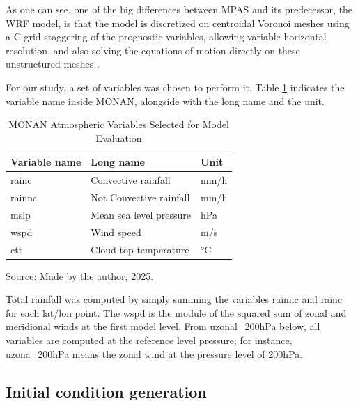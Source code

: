 As one can see, one of the big differences between MPAS and its predecessor, the WRF model, is that the model is discretized on centroidal Voronoi meshes using a C-grid staggering of the prognostic variables, allowing variable horizontal resolution, and also solving the equations of motion directly on these unstructured meshes \cite{skamarock2012multiscale}. 

For our study, a set of variables was chosen to perform it. Table \ref{tab:monan atmospheric variables} indicates the variable name inside MONAN, alongside with the long name and the unit.

\begin{table}[htbp]
	\centering
	\caption{MONAN Atmospheric Variables Selected for Model Evaluation}
	\vspace{2mm}
	\begin{tabular}{@{}lll@{}}
		\toprule
		\textbf{Variable name} & \textbf{Long name} & \textbf{Unit} \\
		\midrule
		rainc & Convective rainfall & mm/h \\
		rainnc & Not Convective rainfall & mm/h \\
		mslp & Mean sea level pressure & hPa \\
		wspd & Wind speed & m/s \\
		ctt & Cloud top temperature & °C \\
		\bottomrule
	\end{tabular}
	\label{tab:monan atmospheric variables}
	\vspace{2mm}
	
	{\centering Source: Made by the author, 2025.\par}
\end{table}

Total rainfall was computed by simply summing the variables rainnc and rainc for each lat/lon point. The wspd is the module of the squared sum of zonal and meridional winds at the first model level. From uzonal\_200hPa below, all variables are computed at the reference level pressure; for instance, uzona\_200hPa means the zonal wind at the pressure level of 200hPa.

\subsection{Initial condition generation}

